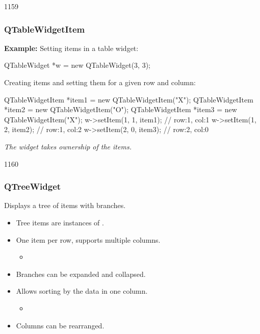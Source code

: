 \begin{slide}[fragile]{1159}\frametitle{QTableWidgetItem}

\textbf{Example:} Setting items in a table widget:

\medskip
\begin{cpp}
 QTableWidget *w = new QTableWidget(3, 3);
\end{cpp}
\medskip

Creating items and setting them for a given row and column:

\begin{cpp}
QTableWidgetItem *item1 = new QTableWidgetItem("X");
QTableWidgetItem *item2 = new QTableWidgetItem("O");
QTableWidgetItem *item3 = new QTableWidgetItem("X");
w->setItem(1, 1, item1); // row:1, col:1
w->setItem(1, 2, item2); // row:1, col:2
w->setItem(2, 0, item3); // row:2, col:0
\end{cpp}

\vspace*{0.5em}
\textit{The widget takes ownership of the items.}

\vfill
{}
\end{slide}

\begin{slide}{1160}\frametitle{QTreeWidget}

Displays a tree of items with branches.

\begin{itemize}
\item Tree items are instances of .
\item One item per row, supports multiple columns.
\begin{itemize}
\item {}
\end{itemize}
\item Branches can be expanded and collapsed.
\item Allows sorting by the data in one column.
\begin{itemize}
\item {}
\end{itemize}
\item Columns can be rearranged.
\end{itemize}

\vspace*{0.5em}

\end{slide}

